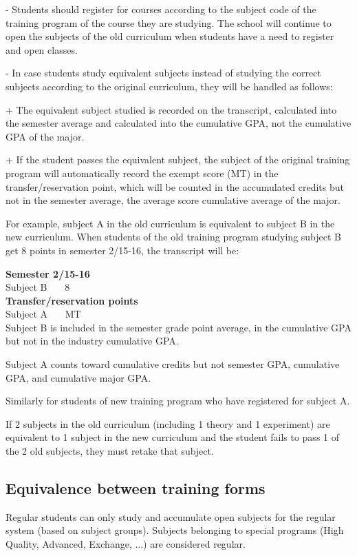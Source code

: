 - Students should register for courses according to the subject code of the training program of the course they are studying. The school will continue to open the subjects of the old curriculum when students have a need to register and open classes.

- In case students study equivalent subjects instead of studying the correct subjects according to the original curriculum, they will be handled as follows:

+ The equivalent subject studied is recorded on the transcript, calculated into the semester average and calculated into the cumulative GPA, not the cumulative GPA of the major.

+ If the student passes the equivalent subject, the subject of the original training program will automatically record the exempt score (MT) in the transfer/reservation point, which will be counted in the accumulated credits but not in the semester average, the average score cumulative average of the major.

For example, subject A in the old curriculum is equivalent to subject B in the new curriculum. When students of the old training program studying subject B get 8 points in semester 2/15-16, the transcript will be:

\noindent\textbf{Semester 2/15-16}\\
Subject B 			~~~8\\
\textbf{Transfer/reservation points}\\
Subject A			~~~MT\\

Subject B is included in the semester grade point average, in the cumulative GPA but not in the industry cumulative GPA.

Subject A counts toward cumulative credits but not semester GPA, cumulative GPA, and cumulative major GPA.

Similarly for students of new training program who have registered for subject A.

If 2 subjects in the old curriculum (including 1 theory and 1 experiment) are equivalent to 1 subject in the new curriculum and the student fails to pass 1 of the 2 old subjects, they must retake that subject.

\subsection{Equivalence between training forms}
Regular students can only study and accumulate open subjects for the regular system (based on subject groups). Subjects belonging to special programs (High Quality, Advanced, Exchange, ...) are considered regular.

